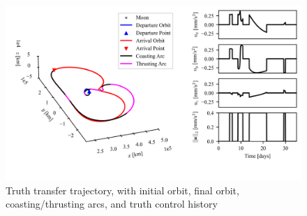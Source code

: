 \documentclass[letterpaper, preprint, paper,11pt]{AAS}	%
\begin{document}
\begin{figure}
    \centering
    \includegraphics[width=\linewidth]{Figures/truth_trajectory.png}
    \caption{Truth transfer trajectory, with initial orbit, final orbit, coasting/thrusting arcs, and truth control history}
    \label{fig:truth_trajectory}
\end{figure}
\end{document}
